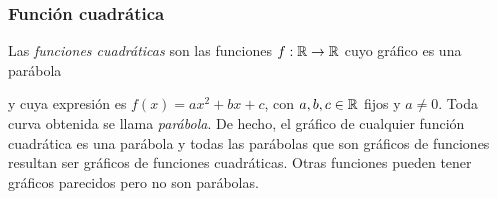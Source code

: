 \documentclass[../Teoría.root.tex]{subfiles}
\begin{document}
\subsubsection{Función cuadrática}
Las \textit{funciones cuadráticas} son las funciones \(f: \mathbb{R} \rightarrow \mathbb{R}\) cuyo gráfico es una parábola
\begin{center}
\end{center}
y cuya expresión es \(f(x)=ax^2+bx+c\), con \(a,b,c\in\mathbb{R}\) fijos y \(a\neq0\).
Toda curva obtenida se llama \textit{parábola}.
De hecho, el gráfico de cualquier función cuadrática es una parábola y todas las parábolas que son gráficos de funciones resultan ser gráficos de funciones cuadráticas.
Otras funciones pueden tener gráficos parecidos pero no son parábolas.
\end{document}
